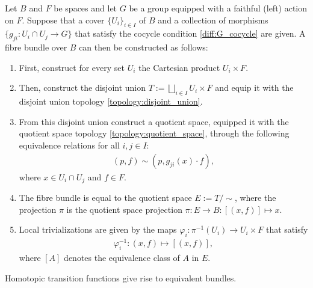     \begin{construct}\label{diff:fibre_bundle_construction_theorem}
        Let $B$ and $F$ be spaces and let $G$ be a group equipped with a faithful (left) action on $F$. Suppose that a cover $\{U_i\}_{i\in I}$ of $B$ and a collection of morphisms $\{g_{ji}:U_i\cap U_j\rightarrow G\}$ that satisfy the cocycle condition \ref{diff:G_cocycle} are given. A fibre bundle over $B$ can then be constructed as follows:
        \begin{enumerate}
            \item First, construct for every set $U_i$ the Cartesian product $U_i\times F$.
            \item Then, construct the disjoint union $T:=\bigsqcup_{i\in I}U_i\times F$ and equip it with the disjoint union topology \ref{topology:disjoint_union}.
            \item From this disjoint union construct a quotient space, equipped it with the quotient space topology \ref{topology:quotient_space}, through the following equivalence relations for all $i,j\in I$:
                \begin{gather}
                    (p,f)\sim(p,g_{ji}(x)\cdot f),
                \end{gather}
                where $x\in U_i\cap U_j$ and $f\in F$.
            \item The fibre bundle is equal to the quotient space $E:=T/\!\sim$, where the projection $\pi$ is the quotient space projection $\pi:E\rightarrow B:[(x,f)]\mapsto x$.
            \item Local trivializations are given by the maps $\varphi_i:\pi^{-1}(U_i)\rightarrow U_i\times F$ that satisfy
                \begin{gather}
                    \varphi_i^{-1}:(x,f)\mapsto [(x,f)],
                \end{gather}
                where $[A]$ denotes the equivalence class of $A$ in $E$.
        \end{enumerate}
    \end{construct}
    \begin{property}
        Homotopic transition functions give rise to equivalent bundles.
    \end{property}


